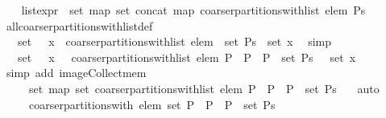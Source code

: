 \begin{isabellebody}
\ \ \isamarkupfalse%
\ {\isachardoublequoteopen}{\isacharquery}list{\isacharunderscore}expr\ {\isacharequal}\ set\ {\isacharparenleft}map\ set\ {\isacharparenleft}concat\ {\isacharparenleft}map\ {\isacharparenleft}coarser{\isacharunderscore}partitions{\isacharunderscore}with{\isacharunderscore}list\ elem{\isacharparenright}\ Ps{\isacharparenright}{\isacharparenright}{\isacharparenright}{\isachardoublequoteclose}\isanewline
\ \ \ \ \isamarkupfalse%
\ all{\isacharunderscore}coarser{\isacharunderscore}partitions{\isacharunderscore}with{\isacharunderscore}list{\isacharunderscore}def\ \isacommand{{\isachardot}{\isachardot}}\isamarkupfalse%
\isanewline
\ \ \isamarkupfalse%
\ \isamarkupfalse%
\ {\isachardoublequoteopen}{\isasymdots}\ {\isacharequal}\ set\ {\isacharbackquote}\ {\isacharparenleft}{\isasymUnion}\ x\ {\isasymin}\ {\isacharparenleft}coarser{\isacharunderscore}partitions{\isacharunderscore}with{\isacharunderscore}list\ elem{\isacharparenright}\ {\isacharbackquote}\ {\isacharparenleft}set\ Ps{\isacharparenright}\ {\isachardot}\ set\ x{\isacharparenright}{\isachardoublequoteclose}\ \isamarkupfalse%
\ simp\isanewline
\ \ \ \ \isanewline
\ \ \isamarkupfalse%
\ \isamarkupfalse%
\ {\isachardoublequoteopen}{\isasymdots}\ {\isacharequal}\ set\ {\isacharbackquote}\ {\isacharparenleft}{\isasymUnion}\ x\ {\isasymin}\ {\isacharbraceleft}\ coarser{\isacharunderscore}partitions{\isacharunderscore}with{\isacharunderscore}list\ elem\ P\ {\isacharbar}\ P\ {\isachardot}\ P\ {\isasymin}\ set\ Ps\ {\isacharbraceright}\ {\isachardot}\ set\ x{\isacharparenright}{\isachardoublequoteclose}\isanewline
\ \ \ \ \isamarkupfalse%
\ {\isacharparenleft}simp\ add{\isacharcolon}\ image{\isacharunderscore}Collect{\isacharunderscore}mem{\isacharparenright}\isanewline
\ \ \isamarkupfalse%
\ \isamarkupfalse%
\ {\isachardoublequoteopen}{\isasymdots}\ {\isacharequal}\ {\isasymUnion}\ {\isacharbraceleft}\ set\ {\isacharparenleft}map\ set\ {\isacharparenleft}coarser{\isacharunderscore}partitions{\isacharunderscore}with{\isacharunderscore}list\ elem\ P{\isacharparenright}{\isacharparenright}\ {\isacharbar}\ P\ {\isachardot}\ P\ {\isasymin}\ set\ Ps\ {\isacharbraceright}{\isachardoublequoteclose}\ \isamarkupfalse%
\ auto\isanewline
\ \ \isamarkupfalse%
\ \isamarkupfalse%
\ {\isachardoublequoteopen}{\isasymdots}\ {\isacharequal}\ {\isasymUnion}\ {\isacharbraceleft}\ coarser{\isacharunderscore}partitions{\isacharunderscore}with\ elem\ {\isacharparenleft}set\ P{\isacharparenright}\ {\isacharbar}\ P\ {\isachardot}\ P\ {\isasymin}\ set\ Ps\ {\isacharbraceright}{\isachardoublequoteclose}\isanewline

\end{isabellebody}
